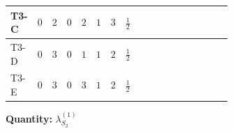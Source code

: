 \documentclass[8pt]{article}
\begin{document}
\begin{landscape}
\begin{longtable}{@{}llcccccc >{\raggedright\arraybackslash}p{0.21\linewidth} >{\raggedright\arraybackslash}p{0.21\linewidth} >{\raggedright\arraybackslash}p{0.21\linewidth}@{}}
\midrule
T3-C & $0$ & $2$ & $0$ & $2$ & $1$ & $3$ & $\frac{1}{2}$ & \scriptsize\adjustbox{max width=\linewidth}{$\begin{gathered} +12 {g_1}^4\end{gathered}$} & \scriptsize\adjustbox{max width=\linewidth}{$\begin{gathered} +4 {\lambda_{12}^{(1)}}^2\end{gathered}$} & \scriptsize\adjustbox{max width=\linewidth}{$\begin{gathered} +4 {\lambda_{HS_2}^{(1)}}^2\end{gathered}$} \\
\midrule
T3-D & $0$ & $3$ & $0$ & $1$ & $1$ & $2$ & $\frac{1}{2}$ & \scriptsize\adjustbox{max width=\linewidth}{$\begin{gathered} 12 {g_1}^4\end{gathered}$} & \scriptsize\adjustbox{max width=\linewidth}{$\begin{gathered} +6 {\lambda_{12}^{(1)}}^2\end{gathered}$} & \scriptsize\adjustbox{max width=\linewidth}{$\begin{gathered} +4 {\lambda_{HS_2}^{(1)}}^2\end{gathered}$} \\
\midrule
T3-E & $0$ & $3$ & $0$ & $3$ & $1$ & $2$ & $\frac{1}{2}$ & \scriptsize\adjustbox{max width=\linewidth}{$\begin{gathered} +12 {g_1}^4\end{gathered}$} & \scriptsize\adjustbox{max width=\linewidth}{$\begin{gathered} +6 {\lambda_{12}^{(1)}}^2\end{gathered}$} & \scriptsize\adjustbox{max width=\linewidth}{$\begin{gathered} +4 {\lambda_{HS_2}^{(1)}}^2\end{gathered}$} \\
\midrule
\bottomrule
\end{longtable}
\clearpage
\noindent\textbf{Quantity: }$\lambda_{S_2}^{(1)}$\par\smallskip

\end{landscape}
\end{document}

